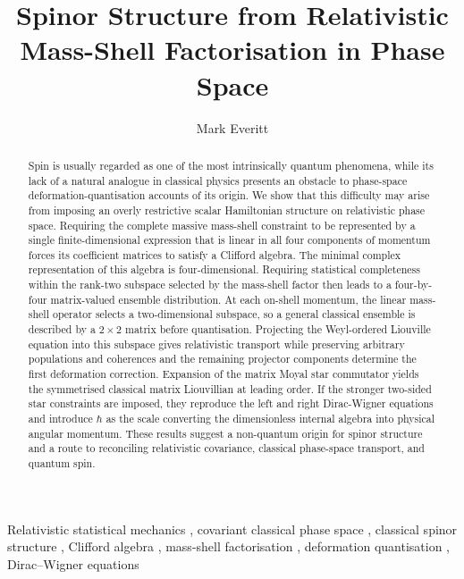 \documentclass[final,5p,times,twocolumn]{elsarticle}
\begin{document}

\begin{frontmatter}

\title{Spinor Structure from Relativistic Mass-Shell Factorisation in Phase Space}

\author[1]{Mark Everitt}
\address[1]{Quantalytics, Spinney Hill Drive, Loughborough, LE11 3LB, UK}

\begin{abstract}
Spin is usually regarded as one of the most intrinsically quantum phenomena, while its lack of a natural analogue in classical physics presents an obstacle to phase-space deformation-quantisation accounts of its origin. 
We show that this difficulty may arise from imposing an overly restrictive scalar Hamiltonian structure on relativistic phase space. 
Requiring the complete massive mass-shell constraint to be represented by a single finite-dimensional expression that is linear in all four components of momentum forces its coefficient matrices to satisfy a Clifford algebra. 
The minimal complex representation of this algebra is four-dimensional. 
Requiring statistical completeness within the rank-two subspace selected by the mass-shell factor then leads to a four-by-four matrix-valued ensemble distribution.
At each on-shell momentum, the linear mass-shell operator selects a two-dimensional subspace, so a general classical ensemble is described by a $2 \times 2$ matrix before quantisation.
Projecting the Weyl-ordered Liouville equation into this subspace gives relativistic transport while preserving arbitrary populations and coherences and the remaining projector components determine the first deformation correction. 
Expansion of the matrix Moyal star commutator yields the symmetrised classical matrix Liouvillian at leading order.
If the stronger two-sided star constraints are imposed, they reproduce the left and right Dirac-Wigner equations and introduce $\hbar$ as the scale converting the dimensionless internal algebra into physical angular momentum.
These results suggest a non-quantum origin for spinor structure and a route to reconciling relativistic covariance, classical phase-space transport, and quantum spin.
\end{abstract}

\begin{keyword}
	Relativistic statistical mechanics \sep 
	covariant classical phase space    \sep 
	classical spinor structure 		   \sep 
	Clifford algebra                   \sep 
	mass-shell factorisation           \sep 
	deformation quantisation           \sep 
	Dirac--Wigner equations
\end{keyword}

\end{frontmatter}
\end{document}
